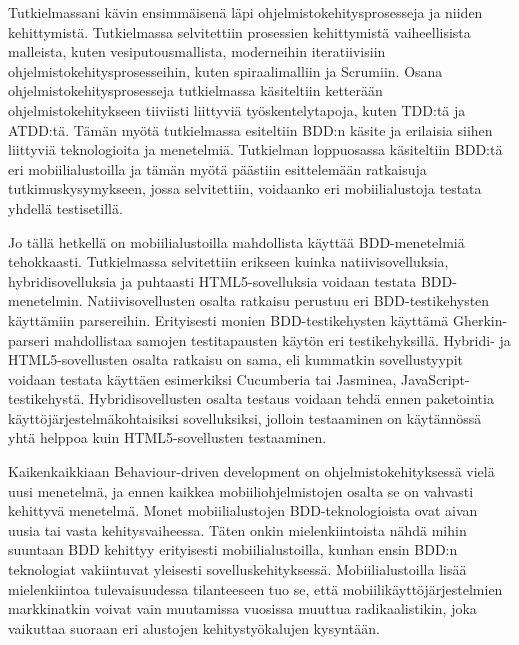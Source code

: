\documentclass[finnish,nonumbib,nocopyright]{gradu2}
\begin{document}
Tutkielmassani kävin ensimmäisenä läpi ohjelmistokehitysprosesseja ja niiden kehittymistä. Tutkielmassa selvitettiin prosessien kehittymistä vaiheellisista malleista, kuten vesiputousmallista, moderneihin iteratiivisiin ohjelmistokehitysprosesseihin, kuten spiraalimalliin ja Scrumiin. Osana ohjelmistokehitysprosesseja tutkielmassa käsiteltiin ketterään ohjelmistokehitykseen tiiviisti liittyviä työskentelytapoja, kuten TDD:tä ja ATDD:tä. Tämän myötä tutkielmassa esiteltiin BDD:n käsite ja erilaisia siihen liittyviä teknologioita ja menetelmiä. Tutkielman loppuosassa käsiteltiin BDD:tä eri mobiilialustoilla ja tämän myötä päästiin esittelemään ratkaisuja tutkimuskysymykseen, jossa selvitettiin, voidaanko eri mobiilialustoja testata yhdellä testisetillä.

Jo tällä hetkellä on mobiilialustoilla mahdollista käyttää BDD-menetelmiä tehokkaasti. Tutkielmassa selvitettiin erikseen kuinka natiivisovelluksia, hybridisovelluksia ja puhtaasti HTML5-sovelluksia voidaan testata BDD-menetelmin. Natiivisovellusten osalta ratkaisu perustuu eri BDD-testikehysten käyttämiin parsereihin. Erityisesti monien BDD-testikehysten käyttämä Gherkin-parseri mahdollistaa samojen testitapausten käytön eri testikehyksillä. Hybridi- ja HTML5-sovellusten osalta ratkaisu on sama, eli kummatkin sovellustyypit voidaan testata käyttäen esimerkiksi Cucumberia tai Jasminea, JavaScript-testikehystä. Hybridisovellusten osalta testaus voidaan tehdä ennen paketointia käyttöjärjestelmäkohtaisiksi sovelluksiksi, jolloin testaaminen on käytännössä yhtä helppoa kuin HTML5-sovellusten testaaminen.

Kaikenkaikkiaan Behaviour-driven development on ohjelmistokehityksessä vielä uusi menetelmä, ja ennen kaikkea mobiiliohjelmistojen osalta se on vahvasti kehittyvä menetelmä. Monet mobiilialustojen BDD-teknologioista ovat aivan uusia tai vasta kehitysvaiheessa. Täten onkin mielenkiintoista nähdä mihin suuntaan BDD kehittyy erityisesti mobiilialustoilla, kunhan ensin BDD:n teknologiat vakiintuvat yleisesti sovelluskehityksessä. Mobiilialustoilla lisää mielenkiintoa tulevaisuudessa tilanteeseen tuo se, että mobiilikäyttöjärjestelmien markkinatkin voivat vain muutamissa vuosissa muuttua radikaalistikin, joka vaikuttaa suoraan eri alustojen kehitystyökalujen kysyntään.
\end{document}

